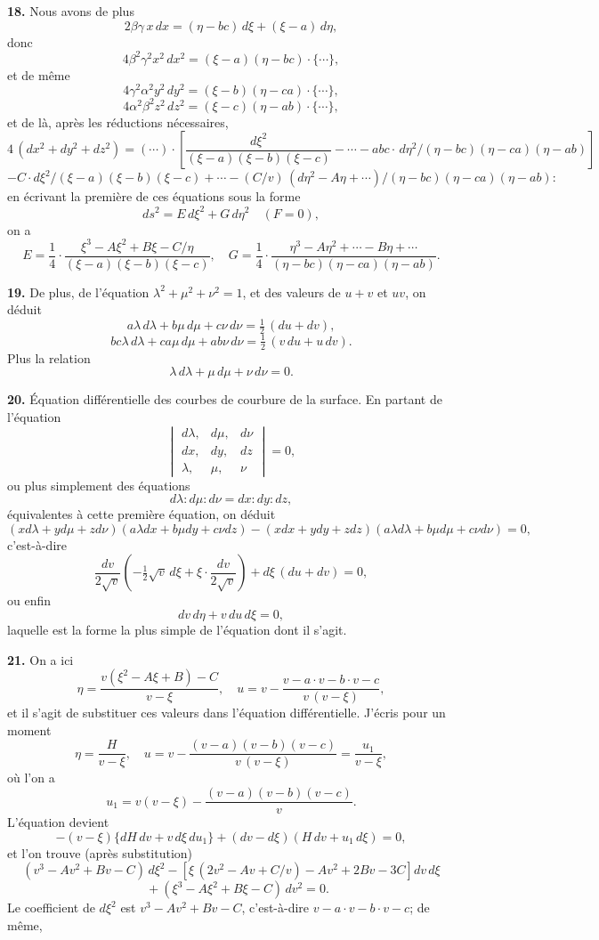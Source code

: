 \documentclass[11pt,a4paper]{article}
\begin{document}
\textbf{18.} Nous avons de plus
\[
2\beta\gamma\,x\,dx = (\eta - bc)\,d\xi + (\xi - a)\,d\eta,
\]
donc
\[
4 \beta^2 \gamma^2 x^2\,dx^2 = (\xi - a)(\eta - bc)\cdot\{\cdots\},
\]
et de m\^eme
\[
4 \gamma^2 \alpha^2 y^2\,dy^2 = (\xi - b)(\eta - ca)\cdot\{\cdots\},
\]
\[
4 \alpha^2 \beta^2 z^2\,dz^2 = (\xi - c)(\eta - ab)\cdot\{\cdots\},
\]
et de l\`a, apr\`es les r\'eductions n\'ecessaires,
\[
4\,(dx^2 + dy^2 + dz^2) = (\cdots)\cdot\left[\frac{d\xi^2}{(\xi - a)(\xi - b)(\xi - c)} - \cdots - abc\cdot\,d\eta^2 / (\eta - bc)(\eta - ca)(\eta - ab)\right]
\]
\[
- C\cdot d\xi^2 \big/ (\xi - a)(\xi - b)(\xi - c) + \cdots - (C/v)\,(d\eta^2 - A\eta + \cdots)\big/(\eta - bc)(\eta - ca)(\eta - ab):
\]
en \'ecrivant la premi\`ere de ces \'equations sous la forme
\[
ds^2 = E\,d\xi^2 + G\,d\eta^2\quad (F = 0),
\]
on a
\[
E = \frac{1}{4}\cdot\frac{\xi^3 - A\xi^2 + B\xi - C/\eta}{(\xi - a)(\xi - b)(\xi - c)},\quad G = \frac{1}{4}\cdot\frac{\eta^3 - A\eta^2 + \cdots - B\eta + \cdots}{(\eta - bc)(\eta - ca)(\eta - ab)}.
\]

\textbf{19.} De plus, de l'\'equation $\lambda^2 + \mu^2 + \nu^2 = 1$, et des valeurs de $u + v$ et $uv$, on d\'eduit
\[
a\lambda\,d\lambda + b\mu\,d\mu + c\nu\,d\nu = \tfrac{1}{2}\,(du + dv),
\]
\[
bc\lambda\,d\lambda + ca\mu\,d\mu + ab\nu\,d\nu = \tfrac{1}{2}\,(v\,du + u\,dv).
\]
Plus la relation
\[
\lambda\,d\lambda + \mu\,d\mu + \nu\,d\nu = 0.
\]

\textbf{20.} \'Equation diff\'erentielle des courbes de courbure de la surface. En partant de l'\'equation
\[
\begin{vmatrix}
d\lambda, & d\mu, & d\nu \\
dx, & dy, & dz \\
\lambda, & \mu, & \nu
\end{vmatrix} = 0,
\]
ou plus simplement des \'equations
\[
d\lambda : d\mu : d\nu = dx : dy : dz,
\]
\'equivalentes \`a cette premi\`ere \'equation, on d\'eduit
\[
(x d\lambda + y d\mu + z d\nu)(a\lambda dx + b\mu dy + c\nu dz) - (x dx + y dy + z dz)(a\lambda d\lambda + b\mu d\mu + c\nu d\nu) = 0,
\]
c'est-\`a-dire
\[
\frac{dv}{2\sqrt{v}}\!\left(-\tfrac{1}{2}\sqrt{v}\,d\xi + \xi\cdot\frac{dv}{2\sqrt{v}}\right) + d\xi\,(du + dv) = 0,
\]
ou enfin
\[
dv\,d\eta + v\,du\,d\xi = 0,
\]
laquelle est la forme la plus simple de l'\'equation dont il s'agit.

\textbf{21.} On a ici
\[
\eta = \frac{v(\xi^2 - A\xi + B) - C}{v - \xi},\quad u = v - \frac{v - a\cdot v - b\cdot v - c}{v\,(v - \xi)},
\]
et il s'agit de substituer ces valeurs dans l'\'equation diff\'erentielle. J'\'ecris pour un moment
\[
\eta = \frac{H}{v - \xi},\quad u = v - \frac{(v - a)(v - b)(v - c)}{v\,(v - \xi)} = \frac{u_1}{v - \xi},
\]
o\`u l'on a
\[
u_1 = v(v - \xi) - \frac{(v - a)(v - b)(v - c)}{v}.
\]
L'\'equation devient
\[
-(v - \xi)\{d H\,dv + v\,d\xi\,d u_1\} + (dv - d\xi)(H\,dv + u_1\,d\xi) = 0,
\]
et l'on trouve (apr\`es substitution)
\[
(v^3 - A v^2 + B v - C)\,d\xi^2 - \left[\xi\,(2 v^2 - A v + C/v) - A v^2 + 2 B v - 3 C\right]dv\,d\xi
\]
\[
\quad + (\xi^3 - A\xi^2 + B\xi - C)\,dv^2 = 0.
\]
Le coefficient de $d\xi^2$ est $v^3 - A v^2 + B v - C$, c'est-\`a-dire $v - a\cdot v - b\cdot v - c$; de m\^eme,
\end{document}
